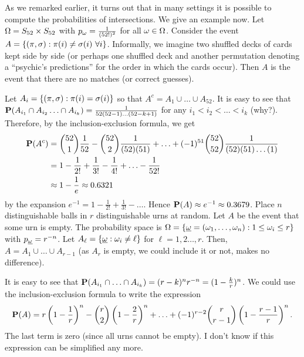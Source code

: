 \documentclass[preprint,  11pt]{amsart}
\def\omeg{\underline{\ome}}
\def\sig{{\sigma}}
\begin{document}
As we remarked earlier,  it turns out that in many settings it is possible to compute the probabilities of intersections. We give an example now. 
\beg \label{eg:matchingnumerisnearlypoisson} Let $\Ome=S_{52}\times S_{52}$ with $p_{\ome}=\frac{1}{(52!)^{2}}$ for all $\ome \in \Ome$. Consider the event $A=\{(\pi,\sig)\suchthat \pi(i)\not=\sig(i) \ \forall i\}$. Informally, we imagine two shuffled decks of cards kept side by side (or perhaps one shuffled deck and another permutation denoting a  ``psychic's predictions'' for the order in which the cards occur). Then $A$ is the event that there are no matches (or correct guesses).

Let $A_{i}=\{(\pi,\sig)\suchthat \pi(i)=\sig(i)\}$ so that $A^{c}=A_{1}\cup \ldots \cup A_{52}$. It is easy to see that $\P(A_{i_{1}}\cap A_{i_{2}}\ldots \cap A_{i_{k}})=\frac{1}{52(52-1)\ldots (52-k+1)}$ for any $i_{1}<i_{2}<\ldots <i_{k}$ (why?). Therefore, by the inclusion-exclusion formula, we get
\begin{align*}
\P(A^{c}) &=  \binom{52}{1}\frac{1}{52}-\binom{52}{2}\frac{1}{(52)(51)} +  \ldots + (-1)^{51} \binom{52}{52}\frac{1}{(52)(51)\ldots (1)}\\
&= 1-\frac{1}{2!}+\frac{1}{3!}-\frac{1}{4!}+\ldots -\frac{1}{52!} \\
&\approx 1-\frac{1}{e} \approx 0.6321
\end{align*}
by the expansion $e^{-1}=1-\frac{1}{2!}+\frac{1}{3!}-\ldots $. Hence $\P(A)\approx e^{-1}\approx 0.3679$.
\eeg 
\beg\label{eg:probofemptyurn2} Place $n$ distinguishable balls in $r$ distinguishable urns at random. Let $A$ be the event that some urn is empty. The probability space is $\Ome=\{\omeg=(\ome_{1},\ldots,\ome_{n})\suchthat 1\le \ome_{i}\le r\}$ with $p_{\omeg}=r^{-n}$. Let $A_{\ell}=\{\omeg\suchthat \ome_{i}\not=\ell\}$ for $\ell=1,2\ldots ,r$. Then, $A=A_{1}\cup \ldots \cup A_{r-1}$ (as $A_{r}$ is empty, we could include it or not, makes no difference).

It is easy to see that $\P(A_{i_{1}}\cap \ldots \cap A_{i_{k}})=(r-k)^{n}r^{-n}=(1-\frac{k}{r})^{n}$. We could use the inclusion-exclusion formula to write the expression
$$
\P(A)=r\l(1-\frac{1}{r}\r)^{n}-\binom{r}{2}\l(1-\frac{2}{r}\r)^{n}+\ldots +(-1)^{r-2}\binom{r}{r-1}\l(1-\frac{r-1}{r}\r)^{n}.
$$
The last term is zero (since all urns cannot be empty). I don't know if this expression can be simplified any more.
\eeg
\end{document}
